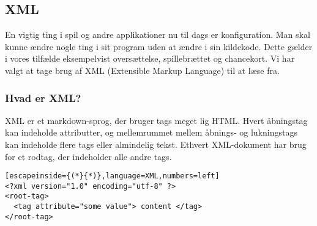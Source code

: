 \documentclass[../../main.tex]{subfiles}
\begin{document}
\subsection{XML}
En vigtig ting i spil og andre applikationer nu til dags er konfiguration. Man skal kunne ændre nogle ting i sit program uden at ændre i sin kildekode. Dette gælder i vores tilfælde eksempelvist oversættelse, spillebrættet og chancekort. Vi har valgt at tage brug af XML (Extensible Markup Language) til at læse fra. 

\subsubsection{Hvad er XML?}
XML er et markdown-sprog, der bruger tags meget lig HTML. Hvert åbningstag kan indeholde attributter, og mellemrummet mellem åbnings- og lukningstags kan indeholde flere tags eller almindelig tekst. Ethvert XML-dokument har brug for et rodtag, der indeholder alle andre tags.


\begin{lstlisting}[escapeinside={(*}{*)},language=XML,numbers=left]
<?xml version="1.0" encoding="utf-8" ?>
<root-tag> 
  <tag attribute="some value"> content </tag>
</root-tag>
\end{lstlisting}
\end{document}
